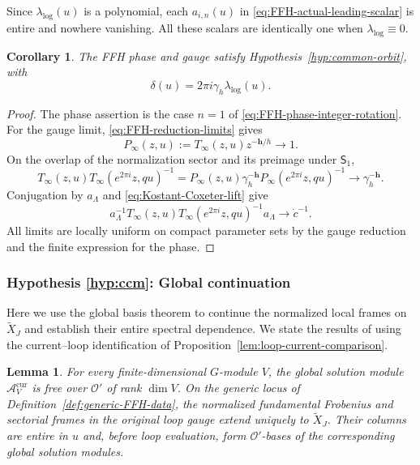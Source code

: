 \documentclass[11pt,leqno]{amsart}
\numberwithin{equation}{section}
\theoremstyle{plain}
\newtheorem{lemma}[theorem]{Lemma}
\newtheorem{corollary}[theorem]{Corollary}
\theoremstyle{definition}
\theoremstyle{plain}
\theoremstyle{definition}
\theoremstyle{remark}
\begin{document}
Since $\lambda_{\log}(u)$ is a polynomial, each $a_{i,n}(u)$ in \eqref{eq:FFH-actual-leading-scalar} is entire and nowhere vanishing.  All these scalars are identically one when $\lambda_{\log}\equiv0$.

\begin{corollary}\label{cor:FFH-rotation-hypothesis}
The FFH phase and gauge satisfy Hypothesis~\ref{hyp:common-orbit}, with
\[
 \delta(u)=2\pi i\gamma_h\lambda_{\log}(u).
\]
\end{corollary}
\begin{proof}
The phase assertion is the case $n=1$ of \eqref{eq:FFH-phase-integer-rotation}.  For the gauge limit, \eqref{eq:FFH-reduction-limits} gives
\[
 P_\infty(z,u):=T_\infty(z,u)z^{-\mathbf h/h}\longrightarrow1.
\]
On the overlap of the normalization sector and its preimage under $\mathsf S_1$,
\[
 T_\infty(z,u)T_\infty(e^{2\pi i}z,qu)^{-1}
 =P_\infty(z,u)\gamma_h^{-\mathbf h}P_\infty(e^{2\pi i}z,qu)^{-1}
 \longrightarrow\gamma_h^{-\mathbf h}.
\]
Conjugation by $a_\Lambda$ and \eqref{eq:Kostant-Coxeter-lift} give
\[
 a_\Lambda^{-1}T_\infty(z,u)
 T_\infty(e^{2\pi i}z,qu)^{-1}a_\Lambda
 \longrightarrow\dot c^{-1}.
\]
All limits are locally uniform on compact parameter sets by the gauge reduction and the finite expression for the phase.
\end{proof}

\subsubsection{Hypothesis \ref{hyp:ccm}: Global continuation}\label{sec:FFH-hyp-global}

Here we use the global basis theorem to continue the normalized local frames on $\widetilde X_J$ and establish their entire spectral dependence.  We state the results of \cite[Theorem~3.9 and Propositions~3.14, 3.20]{MR2024} using the current--loop identification of Proposition~\ref{lem:loop-current-comparison}.
\begin{lemma}\label{lem:globalize-FFH-frames}
For every finite-dimensional $G$-module $V$, the global solution module $\mathcal A_V^{\mathrm{cur}}$ is free over $\mathcal O'$ of rank $\dim V$.  On the generic locus of Definition~\ref{def:generic-FFH-data}, the normalized fundamental Frobenius and sectorial frames in the original loop gauge extend uniquely to $\widetilde X_J$.  Their columns are entire in $u$ and, before loop evaluation, form $\mathcal O'$-bases of the corresponding global solution modules.
\end{lemma}
\end{document}
